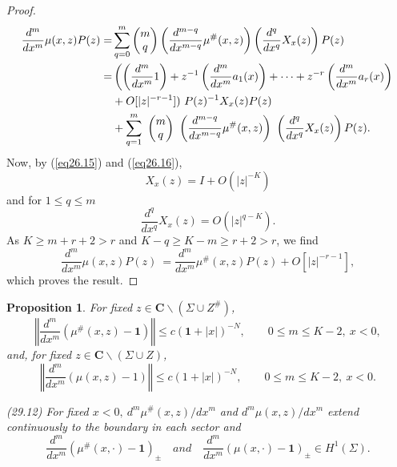 \documentclass{surv-l}
\theoremstyle{plain}
\newtheorem{prop}[theorem]{Proposition}
\theoremstyle{definition}
\numberwithin{equation}{chapter}
\begin{document}
\begin{proof}
\begin{align*}
\frac{d^{m}}{dx^{m}}\mu(x, z)P(z)=&\sum_{q=0}^{m} \left(\begin{array}{@{}c@{}}
m\\
q
\end{array}\right) \left(\frac{d^{m-q}}{dx^{m-q}}\mu^{\#}(x, z)\right)\left(\frac{d^{q}}{dx^{q}}X_{x}(z)\right)P(z)\\
=&\left(\left(\frac{d^{m}}{dx^{m}}1\right)+z^{-1}\left(\frac{d^{m}}{dx^{m}}a_{1}(x)\right)+\cdots +z^{-r}\left(\frac{d^{m}}{dx^{m}}a_{r}(x)\right)\right.\\
&+O[|z|^{-r-1}])\ P(z)^{-1}X_{x}(z)P(z)\\
&+\sum_{q=1}^{m}\ \left(\begin{array}{@{}c@{}}
m\\
q
\end{array}\right)\ \left(\frac{d^{m-q}}{dx^{m-q}}\mu^{\#} (x, z)\right)\ \left(\frac{d^{q}}{dx^{q}}X_{x}(z)\right)P(z).
\end{align*}
Now, by (\ref{eq26.15}) and (\ref{eq26.16}),
\begin{equation*}
X_{x}(z)=I+O(|z|^{-K})
\end{equation*}
and for $1\leq q\leq m$
\begin{equation*}
\frac{d^{q}}{dx^{q}}X_{x}(z)=O(|z|^{q-K}).
\end{equation*}
As $K\geq m+r+2>r$ and $K-q\geq K-m\geq r+2>r$, we find
\begin{equation*}
\frac{d^{m}}{dx^{m}}\mu(x, z)P(z)\ =\frac{d^{m}}{dx^{m}}\mu^{\#}(x, z)P(z)+O[|z|^{-r-1}],
\end{equation*}
which proves the result.
\end{proof}
\begin{prop}\label{prop29.9}
For fixed $z\in \mathbf{C}\backslash (\Sigma\cup Z^{\#})$,
\setcounter{equation}{9}
\begin{equation}\label{eq29.10}
\left\Vert\frac{d^{m}}{dx^{m}}(\mu^{\#} (x, z)-\mathbf{1})\right\Vert\leq c(\mathbf{1}+|x|)^{-N},\qquad 0\leq m\leq K-2,\ x<0,
\end{equation}
and, for fixed $z\in \mathbf{C}\backslash (\Sigma\cup Z)$,
\begin{equation}\label{eq29.11}
\left\Vert\frac{d^{m}}{dx^{m}}(\mu(x, z)-1)\right\Vert\leq c(1+|x|)^{-N},\qquad 0\leq m\leq K-2,\ x<0.
\end{equation}

\emph{(29.12)} For fixed $x<0,\ d^{m}\mu^{\#}(x, z)/dx^{m}$ and $d^{m}\mu(x, z)/dx^{m}$ extend continuously to the boundary in each sector and
\setcounter{equation}{12}
\begin{equation}\label{eq29.13}
\frac{d^{m}}{dx^{m}}(\mu^{\#}(x, \cdot)-\mathbf{1})_{\pm}\quad and\quad \frac{d^{m}}{dx^{m}}(\mu(x, \cdot)-\mathbf{1})_{\pm}\in H^{1}(\Sigma).
\end{equation}
\end{prop}
\end{document}
